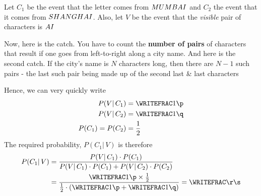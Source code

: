 \begin{solution}[\halfpage]
Let $C_1$ be the event that the letter comes from $MUMBAI$ and $C_2$ 
the event that it comes from $SHANGHAI$. Also, let $V$ be the event that 
the \textit{visible} pair of characters is $AI$

Now, here is the catch. You have to count the \textbf{number of pairs} of characters 
that result if one goes from left-to-right along a city name. And here is the second catch. 
If the city's name is $N$ characters long, then there are $N-1$ such pairs - the last such 
pair being made up of the second last \& last characters

Hence, we can very quickly write 
\begin{align}
  P(V\vert\,C_1) &= \WRITEFRAC\vbsix\p \\ 
  P(V\vert\,C_2) &= \WRITEFRAC\vbseven\q \\ 
  P(C_1) = P(C_2) &= \dfrac{1}{2}
\end{align}
  The required probability, $P(C_1\vert\,V)$ is therefore
  \begin{align}
    P(C_1\vert\,V) &= \dfrac{P(V\vert\,C_1)\cdot P(C_1)}{P(V\vert\,C_1)\cdot P(C_1) + P(V\vert\,C_2)\cdot P(C_2)} \\
    &= \dfrac{\WRITEFRAC\vbsix\p\times\frac{1}{2}}
        {\frac{1}{2}\cdot\left( \WRITEFRAC\vbsix\p + \WRITEFRAC\vbseven\q \right)} = \WRITEFRAC\r\s
  \end{align}
  
\end{solution}

